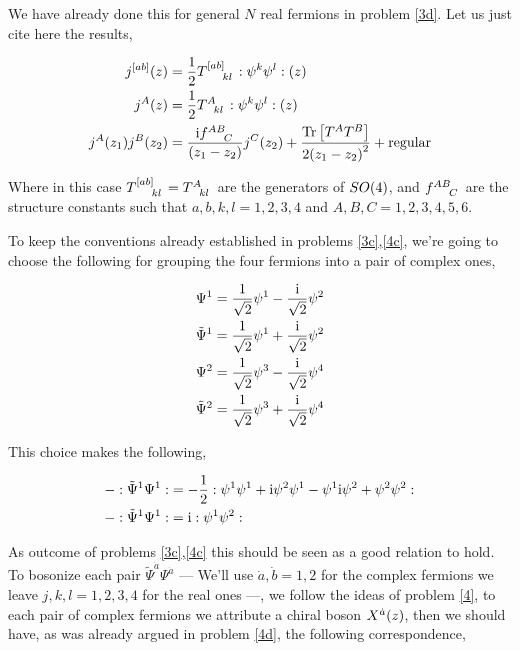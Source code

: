 \problem{}
\probitem{}

We have already done this for general $N$ real fermions in problem \ref{3d}. Let us just cite here the 
results,

\begin{align*}
    j^{\qty[ab]}\qty(z)&=\frac1 2\tensor{T}{^{\qty[ab]}_k_l}\cnord{\psi^k\psi^l}\qty(z)\\
    j^A\qty(z)&=\frac1 2\tensor{T}{^A_k_l}\cnord{\psi^k\psi^l}\qty(z)\\
    j^A\qty(z_1)j ^B\qty(z_2)&=\frac{\im\tensor{f}{^A^B_C}}{\qty(z_1-z_2)}j^C\qty(z_2)+\frac{\Tr\qty[T^A T^B]}{2\qty(z_1-z_2)^2}+\textnormal{regular}
\end{align*}

Where in this case $\tensor{T}{^{\qty[ab]}_k_l}=\tensor{T}{^A_k_l}$ are the generators of $SO\qty(4)$, and $\tensor{f}{^A^B_C}$ are the structure constants such 
that $a,b,k,l=1,2,3,4$ and $A,B,C=1,2,3,4,5,6$.

\probitem{}

To keep the conventions already established in problems \ref{3c},\ref{4c}, we're going to choose the following 
for grouping the four fermions into a pair of complex ones,

\begin{align*}
    {\Psi}^1=\frac{1}{\sqrt{2}}\psi^1-\frac{\textnormal{i}}{\sqrt2}\psi^2\\
    {\tilde\Psi}^1=\frac{1}{\sqrt{2}}\psi^1+\frac{\textnormal{i}}{\sqrt2}\psi^2\\
    {\Psi}^2=\frac{1}{\sqrt{2}}\psi^3-\frac{\textnormal{i}}{\sqrt2}\psi^4\\
    {\tilde\Psi}^2=\frac{1}{\sqrt{2}}\psi^3+\frac{\textnormal{i}}{\sqrt2}\psi^4
\end{align*}

This choice makes the following,


\begin{align*}
    -:{\tilde\Psi}^1\Psi^1:&=-\frac12:\psi^1\psi^1+\textnormal{i}\psi^2\psi^1-\psi^1\textnormal{i}\psi^2+\psi^2\psi^2:\\
    -:{\tilde\Psi}^1\Psi^1:&=\textnormal{i}:\psi^1\psi^2:
\end{align*}

As outcome of problems \ref{3c},\ref{4c} this should be seen as a good relation to hold. To bosonize each pair ${\tilde\Psi}^{\dot a}\Psi^{\dot a}$ --- We'll use $\dot a,\dot b=1,2$ for the complex fermions we 
leave $j,k,l=1,2,3,4$ for the real ones ---, 
we follow the ideas of problem \ref{4}, to each pair of complex fermions we attribute a chiral boson $X^{\dot a}\qty(z)$, then 
we should have, as was already argued in problem \ref{4d}, the following correspondence,

